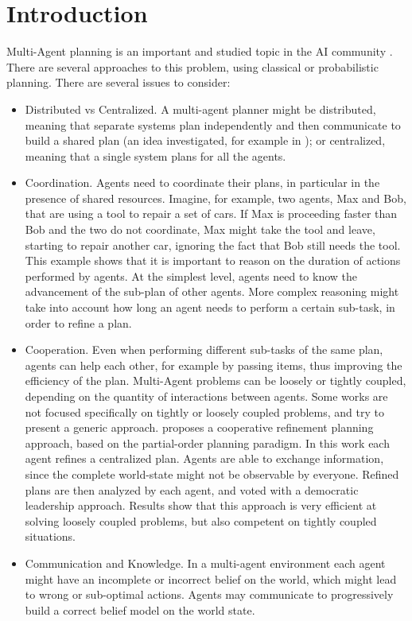 \section{Introduction}
\label{sec:mamdp-intro}
Multi-Agent planning   is an important and studied topic in the AI community \citep{durfee1999survey}. There are several approaches to this problem, using classical or probabilistic planning. There are several issues to consider:
\begin{itemize}
\item Distributed vs Centralized. A multi-agent planner might be distributed, meaning that separate systems plan independently and then communicate to build a shared plan (an idea investigated, for example in \cite{nikolaidis2013cross,guestrin2002distributed} ); or centralized, meaning that a single system plans for all the agents.
\item Coordination. Agents need to coordinate their plans, in particular in the presence of shared resources. Imagine, for example, two agents, Max and Bob, that are using a tool to repair a set of cars. If Max is proceeding faster than Bob and the two do not coordinate, Max might take the tool and leave, starting to repair another car, ignoring the fact that Bob still needs the tool. This example shows that it is important to reason on the duration of actions performed by agents. At the simplest level, agents need to know the advancement of the sub-plan of other agents. More complex reasoning might take into account how long an agent needs to perform a certain sub-task, in order to refine a plan. 
\item Cooperation. Even when performing different sub-tasks of the same plan, agents can help each other, for example by passing items, thus improving the efficiency of the plan. Multi-Agent problems can be loosely or tightly coupled, depending on the quantity of interactions between agents. Some works are not focused specifically on tightly or loosely coupled problems, and try to present a generic approach. \cite{torreno2015approach} proposes a cooperative refinement planning approach, based on the partial-order planning paradigm. In this work each agent refines a centralized plan. Agents are able to exchange information, since the complete world-state might not be observable by everyone. Refined plans are then analyzed by each agent, and voted with a democratic leadership approach. Results show that this approach is very efficient at solving loosely coupled problems, but also competent on tightly coupled situations. 

\item Communication and Knowledge. In a multi-agent environment each agent might have an incomplete or incorrect belief on the world, which might lead to wrong or sub-optimal actions. Agents may communicate to progressively build a correct belief model on the world state. 
\end{itemize}

